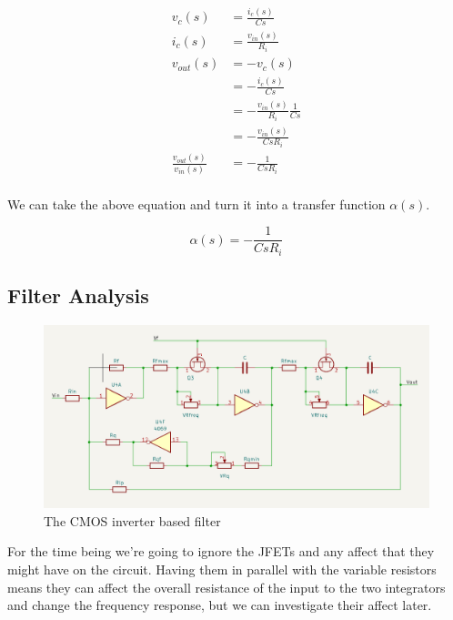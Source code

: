 \documentclass{article}
\begin{document}
\begin{equation*}
\begin{split}
  v_c(s) & = \frac{i_c(s)}{Cs} \\
  i_c(s) & = \frac{v_{in}(s)}{R_{i}} \\
  v_{out}(s) & = -v_c(s) \\
             & = -\frac{i_c(s)}{Cs} \\
             & = -\frac{v_{in}(s)}{R_{i}}\frac{1}{Cs} \\
             & = -\frac{v_{in}(s)}{CsR_{i}} \\
  \frac{v_{out}(s)}{v_{in}(s)} & = -\frac{1}{CsR_{i}} \\
\end{split}
\end{equation*}

We can take the above equation and turn it into a transfer function $\alpha(s)$.

\begin{equation}
  \alpha(s) = -\frac{1}{CsR_{i}}
\end{equation}

\subsection{Filter Analysis}

\begin{figure}[h]
  \caption{The CMOS inverter based filter}
  \includegraphics[width=\linewidth]{images/filter-circuit.png}
\end{figure}

For the time being we're going to ignore the JFETs and any affect that they might have on the circuit. Having them in parallel with the variable resistors means they can affect the overall resistance of the input to the two integrators and change the frequency response, but we can investigate their affect later.
\end{document}
